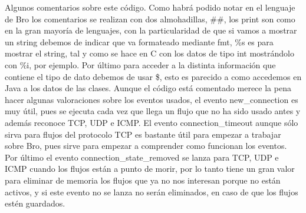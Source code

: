 Algunos comentarios sobre este código. Como habrá podido notar en el 
lenguaje de Bro los comentarios se realizan con dos almohadillas, \#\#, 
los print son como en la gran mayoría de lenguajes, con la particularidad 
de que si vamos a mostrar un string debemos de indicar que va formateado 
mediante fmt, \%s es para mostrar el string, tal y como se hace en C con 
los datos de tipo int mostrándolo con \%i, por ejemplo. Por último para 
acceder a la distinta información que contiene el tipo de dato debemos 
de usar \$, esto es parecido a como accedemos en Java a los datos de las clases.
\intro
Aunque el código está comentado merece la pena hacer algunas valoraciones 
sobre los eventos usados, el evento new\_connection es muy útil, pues se 
ejecuta cada vez que llega un flujo que no ha sido usado antes y además 
reconoce TCP, UDP e ICMP. El evento connection\_timeout aunque sólo sirva 
para flujos del protocolo TCP es bastante útil para empezar a trabajar 
sobre Bro, pues sirve para empezar a comprender como funcionan los eventos. 
Por último el evento connection\_state\_removed se lanza para TCP, UDP e ICMP 
cuando los flujos están a punto de morir, por lo tanto tiene un gran valor 
para eliminar de memoria los flujos que ya no nos interesan porque no están 
activos, y si este evento no se lanza no serán eliminados, en caso de que 
los flujos estén guardados.

